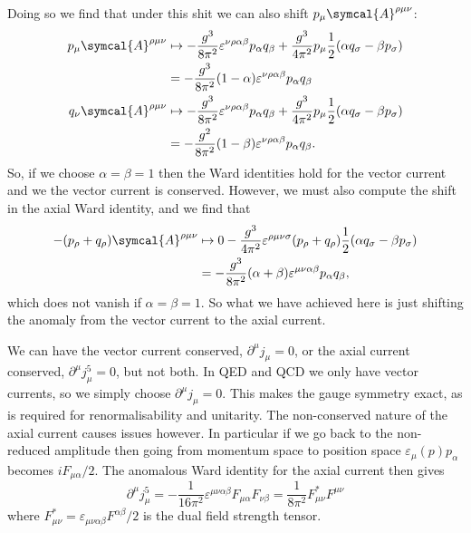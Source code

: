 \documentclass[fleqn]{NotesClass}
\newcommand{\amplitude}{\symcal{A}}
\begin{document}
    Doing so we find that under this shit we can also shift \(p_\mu \amplitude^{\rho\mu\nu}\):
    \begin{align}
        p_\mu \amplitude^{\rho\mu\nu} &\mapsto -\frac{g^3}{8\pi^2}\varepsilon^{\nu\rho\alpha\beta}p_\alpha q_\beta + \frac{g^3}{4\pi^2}p_\mu \frac{1}{2}(\alpha q_\sigma - \beta p_\sigma)\\
        &= -\frac{g^3}{8\pi^2}(1 - \alpha)\varepsilon^{\nu\rho\alpha\beta}p_\alpha q_\beta\\
        q_\nu \amplitude^{\rho\mu\nu} &\mapsto -\frac{g^3}{8\pi^2}\varepsilon^{\nu\rho\alpha\beta}p_\alpha q_\beta + \frac{g^3}{4\pi^2} p_\mu \frac{1}{2}(\alpha q_\sigma - \beta p_\sigma)\\
        &= -\frac{g^2}{8\pi^2}(1 - \beta) \varepsilon^{\nu\rho\alpha\beta} p_\alpha q_\beta.
    \end{align}
    So, if we choose \(\alpha = \beta = 1\) then the Ward identities hold for the vector current and we the vector current is conserved.
    However, we must also compute the shift in the axial Ward identity, and we find that
    \begin{align}
        -(p_\rho + q_\rho) \amplitude^{\rho\mu\nu} &\mapsto 0 - \frac{g^3}{4\pi^2}\varepsilon^{\rho\mu\nu\sigma}(p_\rho + q_\rho)\frac{1}{2}(\alpha q_\sigma - \beta p_\sigma)\\
        &= -\frac{g^3}{8\pi^2}(\alpha + \beta) \varepsilon^{\mu\nu\alpha\beta} p_\alpha q_\beta,
    \end{align}
    which does not vanish if \(\alpha = \beta = 1\).
    So what we have achieved here is just shifting the anomaly from the vector current to the axial current.
    
    We can have the vector current conserved, \(\partial^\mu j_\mu = 0\), or the axial current conserved, \(\partial^\mu j^5_\mu = 0\), but not both.
    In QED and QCD we only have vector currents, so we simply choose \(\partial^\mu j_\mu = 0\).
    This makes the gauge symmetry exact, as is required for renormalisability and unitarity.
    The non-conserved nature of the axial current causes issues however.
    In particular if we go back to the non-reduced amplitude then going from momentum space to position space \(\varepsilon_\mu(p)p_\alpha\) becomes \(iF_{\mu\alpha}/2\).
    The anomalous Ward identity for the axial current then gives
    \begin{equation}
        \partial^\mu j^5_\mu = -\frac{1}{16\pi^2} \varepsilon^{\mu\nu\alpha\beta}F_{\mu\alpha}F_{\nu\beta} = \frac{1}{8\pi^2}F^*_{\mu\nu}F^{\mu\nu}
    \end{equation}
    where \(F^{*}_{\mu\nu} = \varepsilon_{\mu\nu\alpha\beta}F^{\alpha\beta}/2\) is the dual field strength tensor.
    
\end{document}
